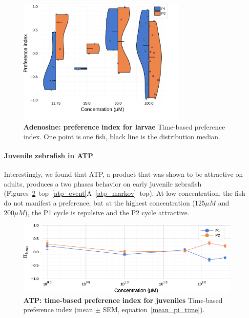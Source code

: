   \begin{figure}[h!]
      \centering
      \includegraphics[width=0.75\textwidth]{part_2/assets/dist_adenosine_lar.png}
      \caption{\textbf{Adenosine: preference index for larvae} Time-based preference index. One point is one fish, black line is the distribution median.}
      \label{dist_adenosine_lar}
    \end{figure}

  \paragraph{Juvenile zebrafish in ATP} Interestingly, we found that ATP, a product that was shown to be attractive on adults, produces a two phases behavior on early juvenile zebrafish (Figures~\ref{atp}~top~\ref{atp_event}A~\ref{atp_markov}~top). At low concentration, the fish do not manifest a preference, but at the highest concentration ($125 \mu  M$  and $200 \mu M$), the P1 cycle is repulsive and the P2 cycle attractive.

    \begin{figure}[h!]
      \centering
      \includegraphics[width=1\textwidth]{part_2/assets/atp.png}
      \caption{\textbf{ATP: time-based preference index for juveniles} Time-based preference index (mean $\pm$ SEM, equation~\ref{mean_pi_time}).}
      \label{atp}
    \end{figure}


